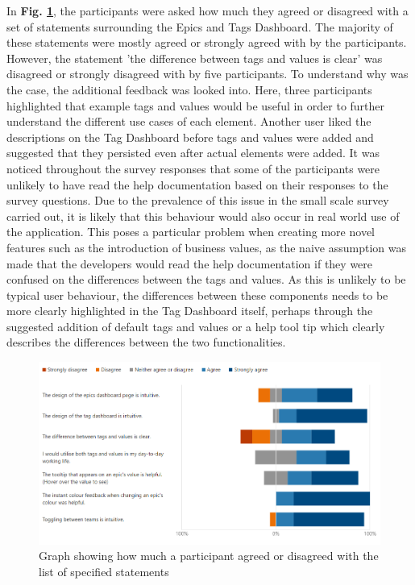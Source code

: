 \documentclass[l4proj.tex]{subfiles}
\begin{document}
In \textbf{Fig. \ref{fig:epic and tag statement feedback}}, the participants were asked how much they agreed or disagreed with a set of statements surrounding the Epics and Tags Dashboard. The majority of these statements were mostly agreed or strongly agreed with by the participants. However, the statement 'the difference between tags and values is clear' was disagreed or strongly disagreed with by five participants. To understand why was the case, the additional feedback was looked into. Here, three participants highlighted that example tags and values would be useful in order to further understand the different use cases of each element. Another user liked the descriptions on the Tag Dashboard before tags and values were added and suggested that they persisted even after actual elements were added. It was noticed throughout the survey responses that some of the participants were unlikely to have read the help documentation based on their responses to the survey questions. Due to the prevalence of this issue in the small scale survey carried out, it is likely that this behaviour would also occur in real world use of the application. This poses a particular problem when creating more novel features such as the introduction of business values, as the naive assumption was made that the developers would read the help documentation if they were confused on the differences between the tags and values. As this is unlikely to be typical user behaviour, the differences between these components needs to be more clearly highlighted in the Tag Dashboard itself, perhaps through the suggested addition of default tags and values or a help tool tip which clearly describes the differences between the two functionalities. 

\begin{figure}[h!]
\begin{center}
\includegraphics[scale=0.5]{dissertation/images/EvaluationEpicsAndTagsStatementGraph.png}
\caption{Graph showing how much a participant agreed or disagreed with the list of specified statements}
\label{fig:epic and tag statement feedback} 
\end{center}
\end{figure}
\end{document}
